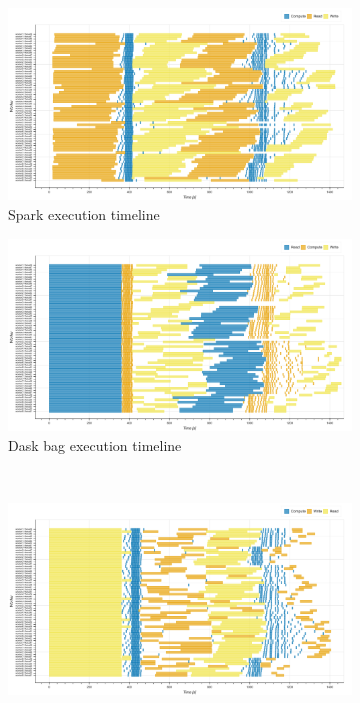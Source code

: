 \documentclass[conference]{IEEEtran}
\begin{document}
\begin{figure}[!t]
    \centering
    \begin{subfigure}[b]{\columnwidth}
        \includegraphics[clip,width=\columnwidth]{images/spark_inc_baseline_gantt.png}
        \caption{Spark execution timeline}\label{fig:inc_spark_gantt}
    \end{subfigure}
    \hfill
    \begin{subfigure}[b]{\columnwidth}
        \includegraphics[clip,width=\columnwidth]{images/Dask_bag_inc_baseline_gantt.png}%
        \caption{Dask bag execution timeline}\label{fig:inc_dask_bag_gantt}
    \end{subfigure}
    \\
    \begin{subfigure}[b]{\columnwidth}
        \includegraphics[clip,width=\columnwidth]{images/Dask_delayed_inc_baseline_gantt.png}%

\end{subfigure}
\end{figure}
\end{document}
